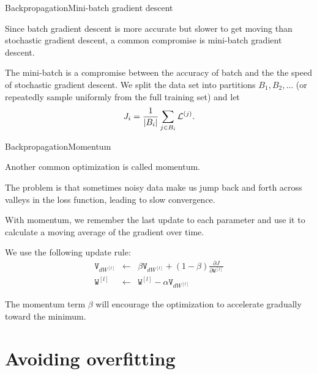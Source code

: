 \documentclass{beamer}
\newcommand{\mat}[1]{\mathtt{#1}}
\begin{document}
\begin{frame}{Backpropagation}{Mini-batch gradient descent}

  Since batch gradient descent is more accurate but slower to get
  moving than stochastic gradient descent, a common compromise is
  \alert{mini-batch gradient descent}.

  \medskip

  The mini-batch is a compromise between the accuracy of batch and the
  the speed of stochastic gradient descent. We split the data set into
  partitions $B_1, B_2, \ldots$ (or repeatedly sample uniformly from
  the full training set) and let
  \[ J_{i} = \frac{1}{|B_i|}\sum_{j \in B_i}{\cal L}^{(j)}. \]

\end{frame}


\begin{frame}{Backpropagation}{Momentum}

  Another common optimization is called \alert{momentum}.

  \medskip

  The problem is that sometimes noisy data make us jump back and forth across valleys in the loss function, leading to slow convergence.

  \medskip

  With momentum, we remember the last update to each parameter and use
  it to calculate a moving average of the gradient over time.

  \medskip

  We use the following update rule:
  \begin{eqnarray*}
    \mat{V}_{dW^{[l]}} & \leftarrow & \beta \mat{V}_{dW^{[l]}}+ (1-\beta)
    \frac{\partial J}{\partial \mat{W}^{[l]}} \\
    \mat{W}^{[l]} & \leftarrow & \mat{W}^{[l]} - \alpha \mat{V}_{dW^{[l]}}
  \end{eqnarray*}

  The momentum term $\beta$ will encourage the optimization to
  accelerate gradually toward the minimum.
    
\end{frame}

\section{Avoiding overfitting}
\end{document}
